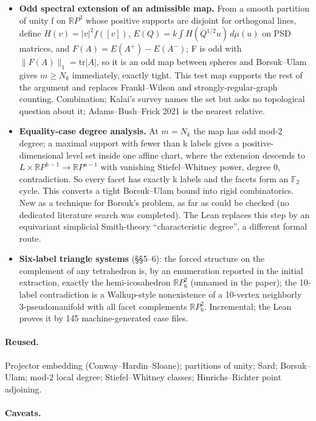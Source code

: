 \documentclass[11pt]{article}
\begin{document}
\begin{itemize}
\item \textbf{Odd spectral extension of an admissible map.} From a smooth partition of unity f on $\mathbb{R}P^3$ whose positive supports are disjoint for orthogonal lines, define $H(v)=|v|^2f([v])$, $E(Q)=k\int H(Q^{1/2}u)\,d\mu(u)$ on PSD matrices, and $F(A)=E(A^+)-E(A^-)$; F is odd with $\|F(A)\|_1=\mathrm{tr}|A|$, so it is an odd map between spheres and Borsuk--Ulam gives $m \ge N_k$ immediately, exactly tight. This test map supports the rest of the argument and replaces Frankl--Wilson and strongly-regular-graph counting. Combination; Kalai's survey names the set but asks no topological question about it; Adams--Bush--Frick 2021 is the nearest relative.
\item \textbf{Equality-case degree analysis.} At $m=N_k$ the map has odd mod-2 degree; a maximal support with fewer than k labels gives a positive-dimensional level set inside one affine chart, where the extension descends to $L\times\mathbb RP^{h-1}\to\mathbb RP^{a-1}$ with vanishing Stiefel--Whitney power, degree 0, contradiction. So every facet has exactly k labels and the facets form an $\mathbb F_2$ cycle. This converts a tight Borsuk--Ulam bound into rigid combinatorics. New as a technique for Borsuk's problem, as far as could be checked (no dedicated literature search was completed). The Lean replaces this step by an equivariant simplicial Smith-theory ``characteristic degree'', a different formal route.
\item \textbf{Six-label triangle systems} (\S{}\S{}5--6): the forced structure on the complement of any tetrahedron is, by an enumeration reported in the initial extraction, exactly the hemi-icosahedron $\mathbb{R}P^2_6$ (unnamed in the paper); the 10-label contradiction is a Walkup-style nonexistence of a 10-vertex neighborly 3-pseudomanifold with all facet complements $\mathbb{R}P^2_6$. Incremental; the Lean proves it by 145 machine-generated case files.
\end{itemize}

\paragraph{Reused.}

Projector embedding (Conway--Hardin--Sloane); partitions of unity; Sard; Borsuk--Ulam; mod-2 local degree; Stiefel--Whitney classes; Hinrichs--Richter point adjoining.

\paragraph{Caveats.}
\end{document}
